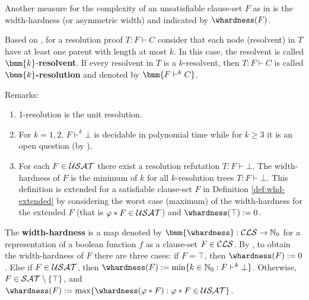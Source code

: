 \documentclass{report}
\begin{document}
Another measure for the complexity of an unsatisfiable clause-set $F$ as in \cite{BeyersdorffKullmann2014PHP, BeyersdorffGwynneKullmann2013PHPER} is the width-hardness (or asymmetric width) and indicated by $\whardness(F)$. 

\begin{defi}\label{def:kres}
Based on \cite{Kl93}, for a resolution proof $T: F \vdash C$ consider that each node (resolvent) in $T$ have at least one parent with length at most $k$. In this case, the resolvent is called $\bmm{k}$-\textbf{resolvent}. If every resolvent in $T$ is a $k$-resolvent, then $T:F \vdash C$ is called $\bmm{k}$\textbf{-resolution} and denoted by $\bmm{F \vdash^k C}$.
\end{defi}
Remarks:
  \begin{enumerate}
  \item 1-resolution is the unit resolution.
  \item For $k=1,2$, $F \vdash^k \bot$ is decidable in polynomial time while for $k \ge 3$ it is an open question (by \cite{BeyersdorffKullmann2014PHP}).
  \item For each $F \in \mathcal{USAT}$ there exist a resolution refutation $T:F \vdash \bot$. The width-hardness of $F$ is the minimum of $k$ for all $k$-resolution trees $T:F \vdash \bot$. This definition is extended for a satisfiable clause-set $F$ in Definition \ref{def:whd-extended} by considering the worst case (maximum) of the width-hardness for the extended $F$ (that is $ \varphi * F \in \mathcal{USAT}$) and $\whardness(\top):=0$.
  \end{enumerate}
 
\begin{defi}\label{def:whd-extended}
The \textbf{width-hardness} is a map denoted by $\bmm{\whardness} : \Cls \rightarrow \NNZ$ for a representation of a boolean function $f$ as a clause-set $F \in \mathcal{CLS}$. By \cite{GwynneKullmann2013GoodRepresentations}, to obtain the width-hardness of  $F$ there are three cases: if $F = \top$, then $\whardness(F) := 0$. Else if $F \in \mathcal{USAT}$, then $\whardness(F) := \min \set{k \in \NNZ : F \vdash^k \bot}$. Otherwise, $F \in \mathcal{SAT} \setminus \{ \top \}$, and $\whardness(F) := \max \set{ \whardness(\vp * F) : \vp * F \in \Usat }$.
\end{defi}
\end{document}
